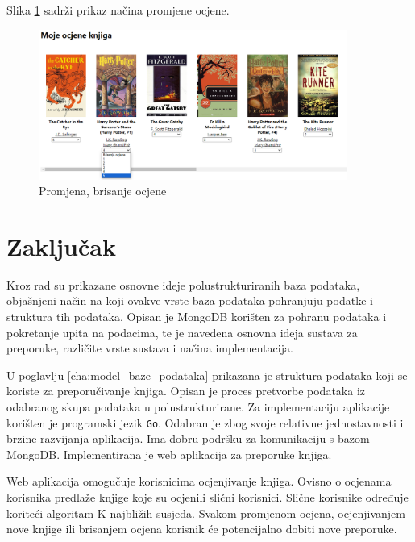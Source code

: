 \documentclass[]{foi}
\begin{document}
Slika \ref{fig:promjena_ocjene} sadrži prikaz načina promjene ocjene.

\begin{figure}[h!]
	\centering
	\includegraphics[width=0.9\textwidth]{slike/promjena_ocjene.png}
	\caption{Promjena, brisanje ocjene}
	\label{fig:promjena_ocjene}
\end{figure}

\chapter{Zaključak}

Kroz rad su prikazane osnovne ideje polustrukturiranih baza podataka, objašnjeni način na koji ovakve vrste baza podataka
pohranjuju podatke i struktura tih podataka.
Opisan je MongoDB korišten za pohranu podataka i pokretanje upita na podacima, te je navedena osnovna ideja sustava za preporuke,
različite vrste sustava i načina implementacija.

U poglavlju \ref{cha:model_baze_podataka} prikazana je struktura podataka koji se koriste za preporučivanje knjiga.
Opisan je proces pretvorbe podataka iz odabranog skupa podataka u polustrukturirane.
Za implementaciju aplikacije korišten je programski jezik \texttt{Go}. Odabran je zbog svoje relativne jednostavnosti i brzine
razvijanja aplikacija. Ima dobru podršku za komunikaciju s bazom MongoDB.
Implementirana je web aplikacija za preporuke knjiga.

Web aplikacija omogučuje korisnicima ocjenjivanje knjiga. Ovisno o ocjenama korisnika predlaže knjige koje su ocjenili
slični korisnici. Slične korisnike određuje koriteći algoritam K-najbližih susjeda. Svakom promjenom ocjena, ocjenjivanjem nove
knjige ili brisanjem ocjena korisnik će potencijalno dobiti nove preporuke.

\makebackmatter
\end{document}
